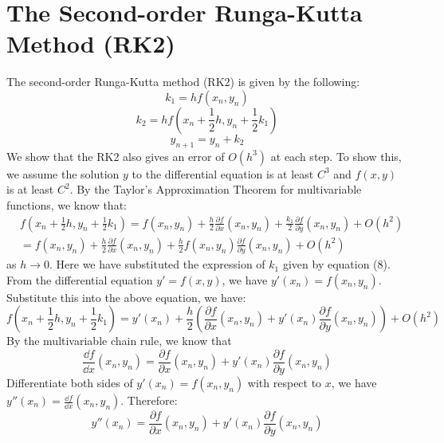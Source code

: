\documentclass{article}
\begin{document}
\section{The Second-order Runga-Kutta Method (RK2)}
The second-order Runga-Kutta method (RK2) is given by the following:
\begin{equation}
  k_1 = hf(x_n, y_n)
\end{equation}
\begin{equation}
  k_2 = hf( x_n+ \frac{1}{2}h, y_n + \frac{1}{2}k_1)
\end{equation}
\begin{equation}
  y_{n+1} = y_n +k_2
\end{equation}
We show that the RK2 also gives an error of \(O(h^3)\) at each step. To show this, we assume the solution \(y\) to the differential
equation is at least \(C^3\) and \(f(x,y)\) is at least \(C^2\). By the Taylor's Approximation Theorem for multivariable
functions, we know that:
\begin{align}
  &f( x_n+ \frac{1}{2}h, y_n + \frac{1}{2}k_1) = f(x_n, y_n) + \frac{h}{2}\frac{\partial f}{\partial x}(x_n, y_n) +
  \frac{k_1}{2} \frac{\partial f}{\partial y}(x_n, y_n) + O(h^2)\\
  &=  f(x_n, y_n) + \frac{h}{2}\frac{\partial f}{\partial x}(x_n, y_n) +
  \frac{h}{2} f(x_n, y_n)\frac{\partial f}{\partial y}(x_n, y_n) + O(h^2)
\end{align}
as \(h\to 0\).
Here we have substituted the expression of \(k_1\) given by equation (8).
From the differential equation \(y' = f(x,y)\), we have \(y'(x_n) = f(x_n, y_n)\). Substitute this into the above
equation, we have:
\begin{equation}
  f( x_n+ \frac{1}{2}h, y_n + \frac{1}{2}k_1) = y'(x_n) + \frac{h}{2} \left(\frac{\partial f}{\partial x}(x_n, y_n) +
  y'(x_n)\frac{\partial f}{\partial y}(x_n, y_n) \right) +O(h^2)
\end{equation}
By the multivariable chain rule, we know that
\begin{equation}
  \frac{\dd f}{\dd x} (x_n, y_n) = \frac{\partial f}{\partial x}(x_n, y_n) + y'(x_n)\frac{\partial f}{\partial y}(x_n, y_n)
\end{equation}
Differentiate both sides of \(y'(x_n) = f(x_n, y_n)\) with respect to \(x\), we have \(y''(x_n) = \frac{\dd f}{\dd x}(x_n, y_n)\).
Therefore:
\begin{equation}
  y''(x_n) = \frac{\partial f}{\partial x}(x_n, y_n) + y'(x_n)\frac{\partial f}{\partial y}(x_n, y_n)
\end{equation}
\end{document}
